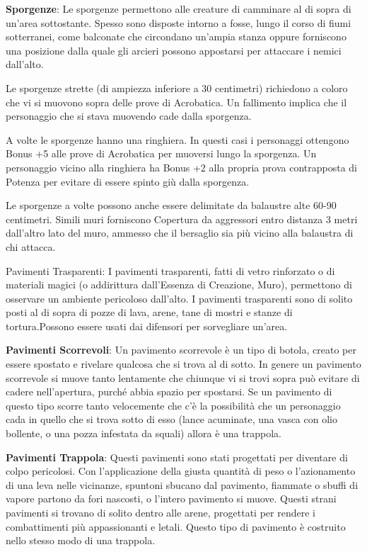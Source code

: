 \documentclass[a4paper,11pt,twoside,openany]{book}
\begin{document}
{\textbf{Sporgenze}: Le sporgenze permettono alle creature di camminare al di sopra di un'area sottostante. Spesso sono disposte intorno a fosse, lungo il corso di fiumi sotterranei, come balconate che circondano un'ampia stanza oppure forniscono una posizione dalla quale gli arcieri possono appostarsi per attaccare i nemici dall'alto. 

Le sporgenze strette (di ampiezza inferiore a 30 centimetri) richiedono a coloro che vi si muovono sopra delle prove di Acrobatica. Un fallimento implica che il personaggio che si stava muovendo cade dalla sporgenza.

A volte le sporgenze hanno una ringhiera. In questi casi i personaggi ottengono Bonus +5 alle prove di Acrobatica per muoversi lungo la sporgenza. Un personaggio vicino alla ringhiera ha Bonus +2 alla propria prova contrapposta di Potenza per evitare di essere spinto giù dalla sporgenza. 

Le sporgenze a volte possono anche essere delimitate da balaustre alte 60-90 centimetri. Simili muri forniscono Copertura da aggressori entro distanza 3 metri dall'altro lato del muro, ammesso che il bersaglio sia più vicino alla balaustra di chi attacca.

Pavimenti Trasparenti: I pavimenti trasparenti, fatti di vetro rinforzato o di materiali magici (o addirittura dall'Essenza di Creazione, Muro), permettono di osservare un ambiente pericoloso dall'alto. I pavimenti trasparenti sono di solito posti al di sopra di pozze di lava, arene, tane di mostri e stanze di tortura.Possono essere usati dai difensori 
per sorvegliare un'area.

\textbf{Pavimenti Scorrevoli}: Un pavimento scorrevole è un tipo di botola, creato per essere spostato e rivelare qualcosa che si trova al di sotto. In genere un pavimento scorrevole si muove tanto lentamente che chiunque vi si trovi sopra può evitare di cadere nell'apertura, purché abbia spazio per spostarsi. Se un pavimento di questo tipo scorre tanto velocemente che c'è la possibilità che un personaggio cada in quello che si trova sotto di esso (lance acuminate, una vasca con olio bollente, o una pozza infestata da squali) allora è una trappola.

\textbf{Pavimenti Trappola}: Questi pavimenti sono stati progettati per diventare di colpo pericolosi. Con l'applicazione della giusta quantità di peso o l'azionamento di una leva nelle vicinanze, spuntoni sbucano dal pavimento, fiammate o sbuffi di vapore partono da fori nascosti, o l'intero pavimento si muove. Questi strani pavimenti si trovano di solito dentro alle arene, progettati per rendere i combattimenti più appassionanti e letali. Questo tipo di pavimento è costruito nello stesso modo di una trappola.

}
\end{document}
